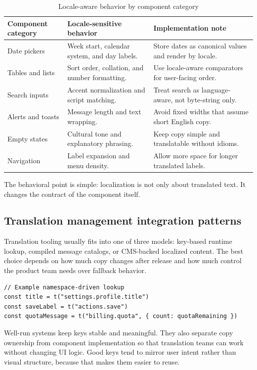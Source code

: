 \begin{table}[htbp]
  \centering
  \caption{Locale-aware behavior by component category}
  \begin{tabularx}{\textwidth}{@{}p{}p{}Y@{}}
    \toprule
    \textbf{Component category} & \textbf{Locale-sensitive behavior} & \textbf{Implementation note} \\
    \midrule
    Date pickers & Week start, calendar system, and day labels. & Store dates as canonical values and render by locale. \\
    Tables and lists & Sort order, collation, and number formatting. & Use locale-aware comparators for user-facing order. \\
    Search inputs & Accent normalization and script matching. & Treat search as language-aware, not byte-string only. \\
    Alerts and toasts & Message length and text wrapping. & Avoid fixed widths that assume short English copy. \\
    Empty states & Cultural tone and explanatory phrasing. & Keep copy simple and translatable without idioms. \\
    Navigation & Label expansion and menu density. & Allow more space for longer translated labels. \\
    \bottomrule
  \end{tabularx}
\end{table}

The behavioral point is simple: localization is not only about translated text. It changes the contract of the component itself.

\subsection{Translation management integration patterns}
Translation tooling usually fits into one of three models: key-based runtime lookup, compiled message catalogs, or CMS-backed localized content. The best choice depends on how much copy changes after release and how much control the product team needs over fallback behavior.

\begin{verbatim}
// Example namespace-driven lookup
const title = t("settings.profile.title")
const saveLabel = t("actions.save")
const quotaMessage = t("billing.quota", { count: quotaRemaining })
\end{verbatim}

Well-run systems keep keys stable and meaningful. They also separate copy ownership from component implementation so that translation teams can work without changing UI logic. Good keys tend to mirror user intent rather than visual structure, because that makes them easier to reuse.

